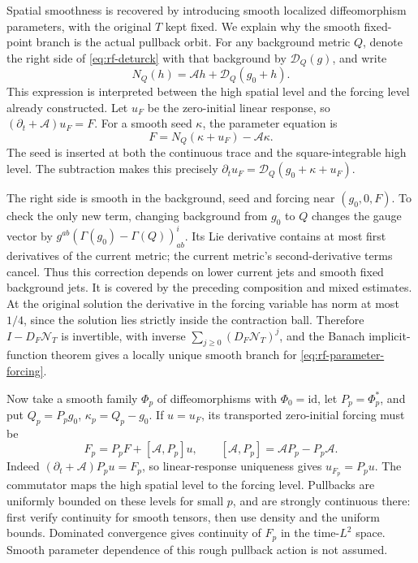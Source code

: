 Spatial smoothness is recovered by introducing smooth localized
diffeomorphism parameters, with the original $T$ kept fixed.
We explain why the smooth fixed-point branch is the actual pullback
orbit.  For any background metric $Q$, denote the right side of
\eqref{eq:rf-deturck} with that background by $\mathscr D_Q(g)$,
and write
\[
 N_Q(h)=\mathcal Ah+\mathscr D_Q(g_0+h).
\]
This expression is interpreted between the high spatial level and
the forcing level already constructed.  Let $u_F$ be the zero-initial
linear response, so $(\partial_t+\mathcal A)u_F=F$.
For a smooth seed $\kappa$, the parameter equation is
\begin{equation}\label{eq:rf-parameter-forcing}
             F=N_Q(\kappa+u_F)-\mathcal A\kappa.
\end{equation}
The seed is inserted at both the continuous trace and the
square-integrable high level.  The subtraction makes this precisely
$\partial_tu_F=\mathscr D_Q(g_0+\kappa+u_F)$.

The right side is smooth in the background, seed and forcing near
$(g_0,0,F)$.  To check the only new term, changing background from
$g_0$ to $Q$ changes the gauge vector by
$g^{ab}(\Gamma(g_0)-\Gamma(Q))^i_{ab}$.
Its Lie derivative contains at most first derivatives of the current
metric; the current metric's second-derivative terms cancel.
Thus this correction depends on lower current jets and smooth fixed
background jets.  It is covered by the preceding composition and
mixed estimates.  At the original solution the derivative in the
forcing variable has norm at most $1/4$, since the solution lies
strictly inside the contraction ball.  Therefore
$I-D_F\mathcal N_T$ is invertible, with inverse
$\sum_{j\geq0}(D_F\mathcal N_T)^j$, and the Banach implicit-function
theorem gives a locally unique smooth branch for
\eqref{eq:rf-parameter-forcing}.

Now take a smooth family $\Phi_p$ of diffeomorphisms with
$\Phi_0=\mathrm{id}$, let $P_p=\Phi_p^*$, and put
$Q_p=P_pg_0$, $\kappa_p=Q_p-g_0$.  If $u=u_F$, its
transported zero-initial forcing must be
\[
 F_p=P_pF+[\mathcal A,P_p]u,
 \qquad [\mathcal A,P_p]=\mathcal AP_p-P_p\mathcal A.
\]
Indeed $(\partial_t+\mathcal A)P_pu=F_p$, so linear-response
uniqueness gives $u_{F_p}=P_pu$.  The commutator maps the high
spatial level to the forcing level.  Pullbacks are uniformly bounded
on these levels for small $p$, and are strongly continuous there:
first verify continuity for smooth tensors, then use density and
the uniform bounds.  Dominated convergence gives continuity of
$F_p$ in the time-$L^2$ space.  Smooth parameter dependence of this
rough pullback action is not assumed.

